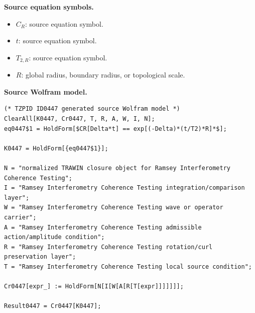 \begin{minipage}[t]{0.49\linewidth}
\begingroup
\small
\raggedright
\textbf{Source equation symbols.}\par
\begin{itemize}[leftmargin=1.35em,itemsep=1pt,topsep=1pt,parsep=0pt]
    \item $C_R$: source equation symbol.
    \item $t$: source equation symbol.
    \item $T_{2,R}$: source equation symbol.
    \item $R$: global radius, boundary radius, or topological scale.
\end{itemize}
\endgroup
\end{minipage}\hfill
\begin{minipage}[t]{0.47\linewidth}
\begingroup
\scriptsize
\raggedright
\textbf{Source Wolfram model.}\par
\begin{Verbatim}[fontsize=\tiny,breaklines=true,breakanywhere=true]
(* TZPID ID0447 generated source Wolfram model *)
ClearAll[K0447, Cr0447, T, R, A, W, I, N];
eq0447$1 = HoldForm[$CR[Delta*t] == exp[(-Delta)*(t/T2)*R]*$];

K0447 = HoldForm[{eq0447$1}];

N = "normalized TRAWIN closure object for Ramsey Interferometry Coherence Testing";
I = "Ramsey Interferometry Coherence Testing integration/comparison layer";
W = "Ramsey Interferometry Coherence Testing wave or operator carrier";
A = "Ramsey Interferometry Coherence Testing admissible action/amplitude condition";
R = "Ramsey Interferometry Coherence Testing rotation/curl preservation layer";
T = "Ramsey Interferometry Coherence Testing local source condition";

Cr0447[expr_] := HoldForm[N[I[W[A[R[T[expr]]]]]]];

Result0447 = Cr0447[K0447];
\end{Verbatim}
\endgroup
\end{minipage}

